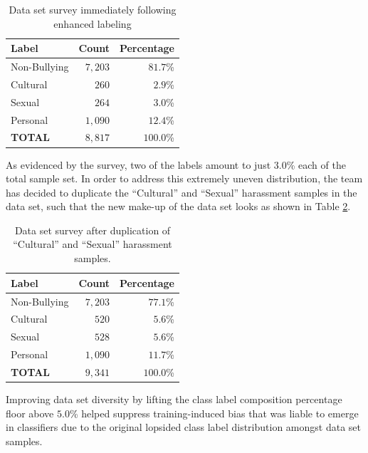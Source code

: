 \documentclass[conference]{sig-alternate-05-2015}
\begin{document}
\begin{table}[ht!]
  \centering
  \begin{tabular}{| l | r | r |}
    \hline
    Label & Count & Percentage \\
    \hline\hline
    Non-Bullying & $7,203$ & $81.7$\% \\
    \hline
    Cultural & $260$ & $2.9$\% \\
    \hline
    Sexual & $264$ & $3.0$\% \\
    \hline
    Personal & $1,090$ & $12.4$\% \\
    \hline\hline
    \textbf{TOTAL} & $8,817$ & $100.0$\% \\
    \hline
  \end{tabular}
  \caption{Data set survey immediately following enhanced labeling}
  \label{tab:dataset_survey_first}
\end{table}

As evidenced by the survey, two of the labels amount to just $3.0$\% each of the
total sample set. In order to address this extremely uneven distribution, the
team has decided to duplicate the ``Cultural'' and ``Sexual'' harassment samples
in the data set, such that the new make-up of the data set looks as shown in
Table \ref{tab:dataset_survey_final}.

\begin{table}[ht!]
  \centering
  \begin{tabular}{| l | r | r |}
    \hline
    Label & Count & Percentage \\
    \hline\hline
    Non-Bullying & $7,203$ & $77.1$\% \\
    \hline
    Cultural & $520$ & $5.6$\% \\
    \hline
    Sexual & $528$ & $5.6$\% \\
    \hline
    Personal & $1,090$ & $11.7$\% \\
    \hline\hline
    \textbf{TOTAL} & $9,341$ & $100.0$\% \\
    \hline
  \end{tabular}
  \caption{Data set survey after duplication of ``Cultural'' and ``Sexual''
  harassment samples.}
  \label{tab:dataset_survey_final}
\end{table}

Improving data set diversity by lifting the class label composition percentage
floor above $5.0$\% helped suppress training-induced bias that was liable to
emerge in classifiers due to the original lopsided class label distribution
amongst data set samples.
\end{document}
